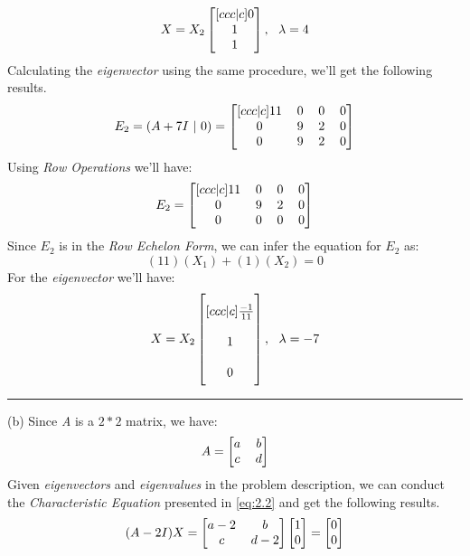 \documentclass[12pt]{article}
\numberwithin{equation}{section}
\numberwithin{table}{section}
\numberwithin{figure}{section}
\begin{document}
$$
	X =  X_2 \renewcommand\arraystretch{1}
	\setlength\arraycolsep{6pt}
	\begin{bmatrix}[ccc|c]
	0\\	
	1\\
	1\\
	\end{bmatrix} , \ \ \lambda = 4
$$
Calculating the \textit{eigenvector} using the same procedure, we'll get the following results.
\begin{equation}\label{eq:2.7}	
E_2 = (A + 7I \ | \ 0) = 
\renewcommand\arraystretch{1}
\setlength\arraycolsep{6pt}
\begin{bmatrix}[ccc|c]
11 & 0 & 0 & 0\\	
0 & 9 & 2 & 0\\
0 & 9 & 2 & 0\\
\end{bmatrix}
\end{equation}
Using \textit{Row Operations} we'll have:
$$
E_2 = 
\renewcommand\arraystretch{1}
\setlength\arraycolsep{6pt}
\begin{bmatrix}[ccc|c]
11 & 0 & 0 & 0\\	
0 & 9 & 2 & 0\\
0 & 0 & 0 & 0\\
\end{bmatrix}
$$
Since $E_2$ is in the \textit{Row Echelon Form}, we can infer the equation for $E_2$ as:
$$
(11)(X_1) + (1)(X_2) = 0
$$
For the \textit{eigenvector} we'll have:
$$
	X =  X_2 \renewcommand\arraystretch{2}
	\setlength\arraycolsep{10pt}
	\begin{bmatrix}[ccc|c]
	\frac{-1}{11}\\	
	1\\
	0\\
	\end{bmatrix} , \ \ \lambda = -7
$$
\noindent\rule{\textwidth}{.5pt}
(b) Since \textit{A} is a $2*2$ matrix, we have:
$$
	A = 
	\renewcommand\arraystretch{1}
	\setlength\arraycolsep{6pt}
	\begin{bmatrix}
	a & b\\	
	c & d\\
	\end{bmatrix}
$$
Given \textit{eigenvectors} and \textit{eigenvalues} in the problem description, we can conduct the \textit{Characteristic Equation} presented in \ref{eq:2.2} and get the following results.
$$
(A - 2 I)X = 
\renewcommand\arraystretch{1}
\setlength\arraycolsep{6pt}
\begin{bmatrix}
a-2 & b\\	
c & d-2\\
\end{bmatrix}
\begin{bmatrix}
1\\
0 \\
\end{bmatrix} = \begin{bmatrix}
0\\
0 \\
\end{bmatrix}
$$
\end{document}
